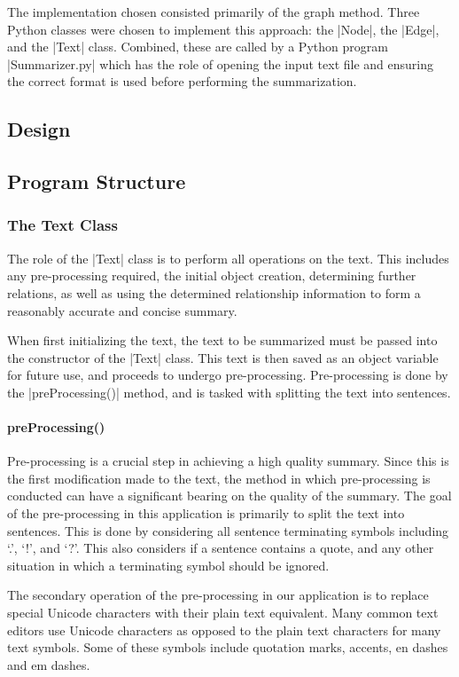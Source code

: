 
The implementation chosen consisted primarily of the graph method. Three Python classes were chosen to implement this approach: the |Node|, the |Edge|, and the |Text| class. Combined, these are called by a Python program |Summarizer.py| which has the role of opening the input text file and ensuring the correct format is used before performing the summarization.

\subsection{Design}



\subsection{Program Structure}
	\subsubsection{The Text Class}
	The role of the |Text| class is to perform all operations on the text. This includes any pre-processing required, the initial object creation, determining further relations, as well as using the determined relationship information to form a reasonably accurate and concise summary.
	
	When first initializing the text, the text to be summarized must be passed into the constructor of the |Text| class. This text is then saved as an object variable for future use, and proceeds to undergo pre-processing. Pre-processing is done by the |preProcessing()| method, and is tasked with splitting the text into sentences.
	
	\paragraph{preProcessing()}
		Pre-processing is a crucial step in achieving a high quality summary. Since this is the first modification made to the text, the method in which pre-processing is conducted can have a significant bearing on the quality of the summary. The goal of the pre-processing in this application is primarily to split the text into sentences. This is done by considering all sentence terminating symbols including `.', `!', and `?'. This also considers if a sentence contains a quote, and any other situation in which a terminating symbol should be ignored.
		
		The secondary operation of the pre-processing in our application is to replace special Unicode characters with their plain text equivalent. Many common text editors use Unicode characters as opposed to the plain text characters for many text symbols. Some of these symbols include quotation marks, accents, en dashes and em dashes.
		
